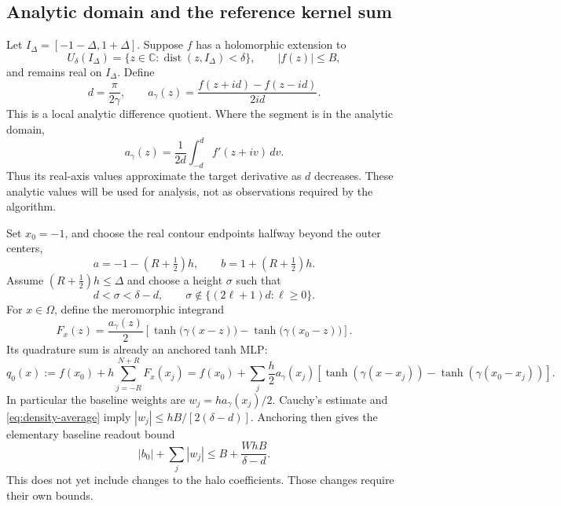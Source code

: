 \documentclass[11pt]{article}
\theoremstyle{definition}\newtheorem{definition}[theorem]{Definition}
\theoremstyle{remark}\newtheorem{remark}[theorem]{Remark}
\numberwithin{equation}{section}
\newcommand{\C}{\mathbb C}
\begin{document}
\subsection{Analytic domain and the reference kernel sum}
Let $I_\Delta=[-1-\Delta,1+\Delta]$. Suppose $f$ has a holomorphic extension to
\[
 U_\delta(I_\Delta)=\{z\in\C:\operatorname{dist}(z,I_\Delta)<\delta\},
 \qquad |f(z)|\le B,
\]
and remains real on $I_\Delta$. Define
\begin{equation}
 d=\frac{\pi}{2\gamma},\qquad
 a_\gamma(z)=\frac{f(z+id)-f(z-id)}{2id}.
 \label{eq:density}
\end{equation}
This is a local analytic difference quotient. Where the segment is in the analytic domain,
\begin{equation}
 a_\gamma(z)=\frac1{2d}\int_{-d}^d f'(z+iv)\,dv.
 \label{eq:density-average}
\end{equation}
Thus its real-axis values approximate the target derivative as $d$ decreases. These analytic values will be used for analysis, not as observations required by the algorithm.

Set $x_0=-1$, and choose the real contour endpoints halfway beyond the outer centers,
\[
 a=-1-(R+\tfrac12)h,\qquad b=1+(R+\tfrac12)h.
\]
Assume $(R+\tfrac12)h\le\Delta$ and choose a height $\sigma$ such that
\begin{equation}
 d<\sigma<\delta-d,\qquad
 \sigma\notin\{(2\ell+1)d:\ell\ge0\}.
 \label{eq:contour-assumptions}
\end{equation}
For $x\in\Omega$, define the meromorphic integrand
\begin{equation}
 F_x(z)=\frac{a_\gamma(z)}2
 \left[\tanh\bigl(\gamma(x-z)\bigr)
       -\tanh\bigl(\gamma(x_0-z)\bigr)\right].
 \label{eq:integrand}
\end{equation}
Its quadrature sum is already an anchored tanh MLP:
\begin{equation}
 q_0(x):=f(x_0)+h\sum_{j=-R}^{N+R}F_x(x_j)
 =f(x_0)+\sum_j\frac h2a_\gamma(x_j)
 [\tanh(\gamma(x-x_j))-\tanh(\gamma(x_0-x_j))].
 \label{eq:q0}
\end{equation}
In particular the baseline weights are $w_j=ha_\gamma(x_j)/2$. Cauchy's estimate and \eqref{eq:density-average} imply $|w_j|\le hB/[2(\delta-d)]$. Anchoring then gives the elementary baseline readout bound
\begin{equation}
 |b_0|+\sum_j|w_j|\le B+\frac{WhB}{\delta-d}.
 \label{eq:baseline-readout}
\end{equation}
This does not yet include changes to the halo coefficients. Those changes require their own bounds.
\end{document}
